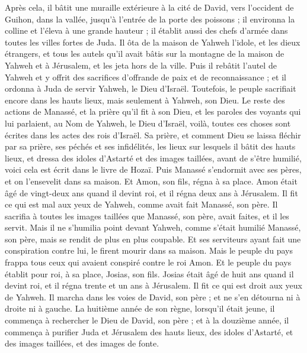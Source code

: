 \begin{multicols}{2}
Après cela, il bâtit une muraille extérieure à la cité de David, vers  l'occident de Guihon, dans la vallée, jusqu'à l'entrée de la porte des poissons ; il environna la colline et l’éleva à une grande hauteur ; il établit aussi des chefs d'armée dans toutes les villes fortes de Juda.
Il ôta de la maison de Yahweh l'idole, et les dieux étrangers, et tous les autels qu'il avait bâtis sur la montagne de la maison de Yahweh et à Jérusalem, et les jeta hors de la ville.
Puis il rebâtit l'autel de Yahweh et y offrit des sacrifices d'offrande de paix et de reconnaissance ; et il ordonna à Juda de servir Yahweh, le Dieu d'Israël.
Toutefois, le peuple sacrifiait encore dans les hauts lieux, mais seulement à Yahweh, son Dieu.
Le reste des actions de Manassé, et la prière qu'il fit à son Dieu, et les paroles des voyants qui lui parlaient, au Nom de Yahweh, le Dieu d'Israël, voilà, toutes ces choses sont écrites dans les actes des rois d'Israël.
Sa prière, et comment Dieu se laissa fléchir par sa prière, ses péchés et ses infidélités, les lieux sur lesquels il bâtit des hauts lieux, et dressa des idoles d'Astarté et des images taillées, avant de s'être humilié, voici cela est écrit dans le livre de Hozaï.
Puis Manassé s'endormit avec ses pères, et on l'ensevelit dans sa maison. Et Amon, son fils, régna à sa place.
Amon était âgé de vingt-deux ans quand il devint roi, et il régna deux ans à Jérusalem.
Il fit ce qui est mal aux yeux de Yahweh, comme avait fait Manassé, son père. Il sacrifia à toutes les images taillées que Manassé, son père, avait faites, et il les servit.
Mais il ne s'humilia point devant Yahweh, comme s'était humilié Manassé, son père, mais se rendit de plus en plus coupable.
Et ses serviteurs ayant fait une conspiration contre lui, le firent mourir dans sa maison.
Mais le peuple du pays frappa tous ceux qui avaient conspiré contre le roi Amon. Et le peuple du pays établit pour roi, à sa place, Josias, son fils.
\VerseOne{}Josias était âgé de huit ans quand il devint roi, et il régna trente et un ans à Jérusalem.
Il fit ce qui est droit aux yeux de Yahweh. Il marcha dans les voies de David, son père ; et ne s'en détourna ni à droite ni à gauche.
La huitième année de son règne, lorsqu'il était jeune, il commença à rechercher le Dieu de David, son père ; et à la douzième année, il commença à purifier Juda et Jérusalem des hauts lieux, des idoles d'Astarté, et des images taillées, et des images de fonte.

\end{multicols}
